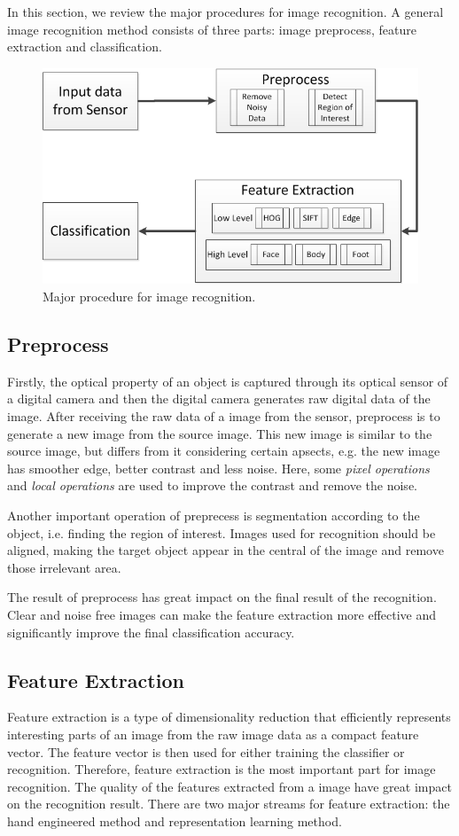 In this section, we review the major procedures for image recognition. 
A general image recognition method consists of three parts: image preprocess, feature extraction and classification.

\begin{figure}
	\centering
	\includegraphics[scale=.8]{introduction/fig/IRflow.png}
	\caption{Major procedure for image recognition.}\label{fig:intro:irflow}
\end{figure}
\subsection{Preprocess}
Firstly, the optical property of an object is captured through its optical sensor of a digital camera and then the digital camera generates raw digital data of the image.
After receiving the raw data of a image from the sensor, preprocess is to generate a new image from the source image. This new image is similar to the source image, but differs from it considering certain apsects, e.g. the new image has smoother edge, better contrast and less noise. 
Here, some \textit{pixel operations} and \textit{local operations} are used to improve the contrast and remove the noise.  

Another important operation of preprecess is segmentation according to the object, i.e. finding the region of interest. Images used for recognition should be aligned, making the target object appear in the central of the image and remove those irrelevant area.

The result of preprocess has great impact on the final result of the recognition. Clear and noise free images can make the feature extraction more effective and significantly improve the final classification accuracy.

\subsection{Feature Extraction}
Feature extraction is a type of dimensionality reduction that efficiently represents interesting parts of an image from the raw image data as a compact feature vector. The feature vector is then used for either training the classifier or recognition. Therefore, feature extraction is the most important part for image recognition. The quality of the features extracted from a image have great impact on the recognition result. There are two major streams for feature extraction: the hand engineered method and representation learning method.
